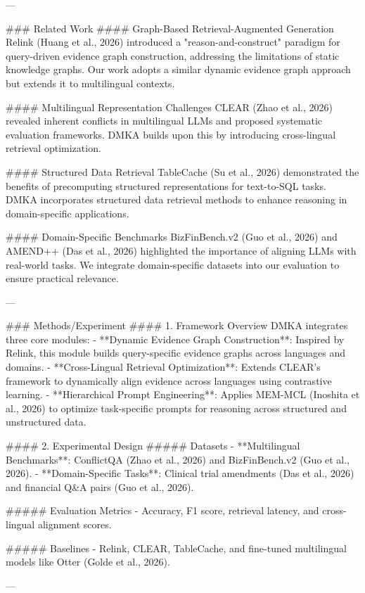 ---

### Related Work  
#### Graph-Based Retrieval-Augmented Generation  
Relink (Huang et al., 2026) introduced a "reason-and-construct" paradigm for query-driven evidence graph construction, addressing the limitations of static knowledge graphs. Our work adopts a similar dynamic evidence graph approach but extends it to multilingual contexts.

#### Multilingual Representation Challenges  
CLEAR (Zhao et al., 2026) revealed inherent conflicts in multilingual LLMs and proposed systematic evaluation frameworks. DMKA builds upon this by introducing cross-lingual retrieval optimization.

#### Structured Data Retrieval  
TableCache (Su et al., 2026) demonstrated the benefits of precomputing structured representations for text-to-SQL tasks. DMKA incorporates structured data retrieval methods to enhance reasoning in domain-specific applications.

#### Domain-Specific Benchmarks  
BizFinBench.v2 (Guo et al., 2026) and AMEND++ (Das et al., 2026) highlighted the importance of aligning LLMs with real-world tasks. We integrate domain-specific datasets into our evaluation to ensure practical relevance.

---

### Methods/Experiment  
#### 1. Framework Overview  
DMKA integrates three core modules:  
- **Dynamic Evidence Graph Construction**: Inspired by Relink, this module builds query-specific evidence graphs across languages and domains.  
- **Cross-Lingual Retrieval Optimization**: Extends CLEAR’s framework to dynamically align evidence across languages using contrastive learning.  
- **Hierarchical Prompt Engineering**: Applies MEM-MCL (Inoshita et al., 2026) to optimize task-specific prompts for reasoning across structured and unstructured data.

#### 2. Experimental Design  
##### Datasets  
- **Multilingual Benchmarks**: ConflictQA (Zhao et al., 2026) and BizFinBench.v2 (Guo et al., 2026).  
- **Domain-Specific Tasks**: Clinical trial amendments (Das et al., 2026) and financial Q&A pairs (Guo et al., 2026).  

##### Evaluation Metrics  
- Accuracy, F1 score, retrieval latency, and cross-lingual alignment scores.

##### Baselines  
- Relink, CLEAR, TableCache, and fine-tuned multilingual models like Otter (Golde et al., 2026).

---

